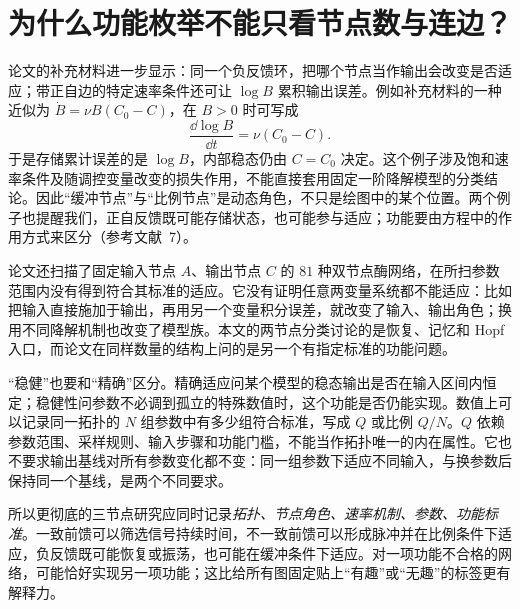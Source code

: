 \section{为什么功能枚举不能只看节点数与连边？}
论文的补充材料进一步显示：同一个负反馈环，把哪个节点当作输出会改变是否适应；带正自边的特定速率条件还可让 $\log B$ 累积输出误差。例如补充材料的一种近似为 $\dot B=\nu B(C_0-C)$，在 $B>0$ 时可写成
\[
\frac{\dd\log B}{\dd t}=\nu(C_0-C).
\]
于是存储累计误差的是 $\log B$，内部稳态仍由 $C=C_0$ 决定。这个例子涉及饱和速率条件及随调控变量改变的损失作用，不能直接套用固定一阶降解模型的分类结论。因此“缓冲节点”与“比例节点”是动态角色，不只是绘图中的某个位置。两个例子也提醒我们，正自反馈既可能存储状态，也可能参与适应；功能要由方程中的作用方式来区分（参考文献~7）。

论文还扫描了固定输入节点 $A$、输出节点 $C$ 的 $81$ 种双节点酶网络，在所扫参数范围内没有得到符合其标准的适应。它没有证明任意两变量系统都不能适应：比如把输入直接施加于输出，再用另一个变量积分误差，就改变了输入、输出角色；换用不同降解机制也改变了模型族。本文的两节点分类讨论的是恢复、记忆和 Hopf 入口，而论文在同样数量的结构上问的是另一个有指定标准的功能问题。

“稳健”也要和“精确”区分。精确适应问某个模型的稳态输出是否在输入区间内恒定；稳健性问参数不必调到孤立的特殊数值时，这个功能是否仍能实现。数值上可以记录同一拓扑的 $N$ 组参数中有多少组符合标准，写成 $Q$ 或比例 $Q/N$。$Q$ 依赖参数范围、采样规则、输入步骤和功能门槛，不能当作拓扑唯一的内在属性。它也不要求输出基线对所有参数变化都不变：同一组参数下适应不同输入，与换参数后保持同一个基线，是两个不同要求。

所以更彻底的三节点研究应同时记录\emph{拓扑、节点角色、速率机制、参数、功能标准}。一致前馈可以筛选信号持续时间，不一致前馈可以形成脉冲并在比例条件下适应，负反馈既可能恢复或振荡，也可能在缓冲条件下适应。对一项功能不合格的网络，可能恰好实现另一项功能；这比给所有图固定贴上“有趣”或“无趣”的标签更有解释力。

